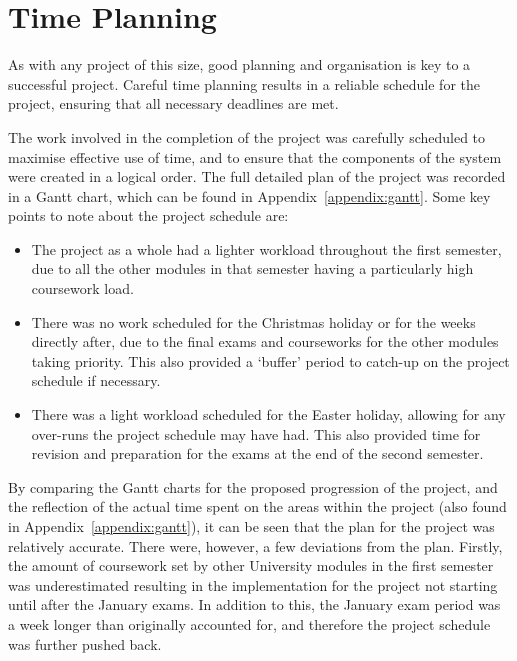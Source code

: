 \documentclass[11pt,a4paper]{report}
\begin{document}
\section{Time Planning}
As with any project of this size, good planning and organisation is key to a successful project. Careful time planning results in a reliable schedule for the project, ensuring that all necessary deadlines are met.

The work involved in the completion of the project was carefully scheduled to maximise effective use of time, and to ensure that the components of the system were created in a logical order. The full detailed plan of the project was recorded in a Gantt chart, which can be found in Appendix~\ref{appendix:gantt}. Some key points to note about the project schedule are:
\begin{itemize}
    \item The project as a whole had a lighter workload throughout the first semester, due to all the other modules in that semester having a particularly high coursework load.
    \item There was no work scheduled for the Christmas holiday or for the weeks directly after, due to the final exams and courseworks for the other modules taking priority. This also provided a `buffer' period to catch-up on the project schedule if necessary.
    \item There was a light workload scheduled for the Easter holiday, allowing for any over-runs the project schedule may have had. This also provided time for revision and preparation for the exams at the end of the second semester.
\end{itemize}

By comparing the Gantt charts for the proposed progression of the project, and the reflection of the actual time spent on the areas within the project (also found in Appendix~\ref{appendix:gantt}), it can be seen that the plan for the project was relatively accurate. There were, however, a few deviations from the plan. Firstly, the amount of coursework set by other University modules in the first semester was underestimated resulting in the implementation for the project not starting until after the January exams. In addition to this, the January exam period was a week longer than originally accounted for, and therefore the project schedule was further pushed back.
\end{document}
